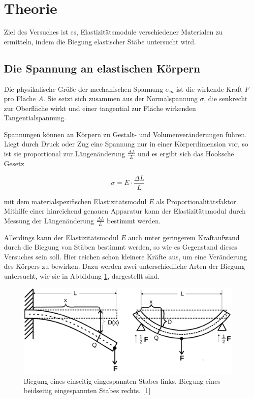 \section{Theorie}
\label{sec:Theorie}

Ziel des Versuches ist es, Elastizitätsmodule verschiedener Materialen
zu ermitteln, indem die Biegung elastischer Stäbe untersucht wird.

\subsection{Die Spannung an elastischen Körpern}

Die physikalische Größe der mechanischen Spannung $\sigma_m$ ist die wirkende
Kraft $F$ pro Fläche $A$. Sie setzt sich zusammen aus der Normalspannung $\sigma$,
die senkrecht zur Oberfläche wirkt und einer tangential zur Fläche wirkenden
Tangentialspannung.

Spannungen können an Körpern zu Gestalt- und Volumenveränderungen
führen. Liegt durch Druck oder Zug eine Spannung nur in einer Körperdimension vor, 
so ist sie proportional zur Längenänderung $\frac{\Delta L}{L}$ und es ergibt sich
das Hooksche Gesetz

\begin{equation*}
    \sigma = E \cdot \frac{\Delta L}{L}
\end{equation*}

mit dem materialspezifischen Elastizitätsmodul $E$ als Proportionalitätsfaktor.
Mithilfe einer hinreichend genauen Apparatur kann der Elastizitätsmodul durch
Messung der Längenänderung $\frac{\Delta L}{L}$ bestimmt werden.

Allerdings kann der Elastizitätsmodul $E$ auch unter geringerem Kraftaufwand
durch die Biegung von Stäben bestimmt werden, so wie es Gegenstand dieses
Versuches sein soll. Hier reichen schon kleinere Kräfte aus, um eine Veränderung 
des Körpers zu bewirken. Dazu werden zwei unterschiedliche Arten der Biegung
untersucht, wie sie in Abbildung \ref{fig:abb1}, dargestellt sind.

\begin{figure}
    \centering
    \includegraphics[scale=0.2]{content/Biegungen.png}
    \caption{Biegung eines einseitig eingespannten Stabes links.\newline
    Biegung eines beidseitig eingespannten Stabes rechts. [1]}
    \label{fig:abb1}
\end{figure}

